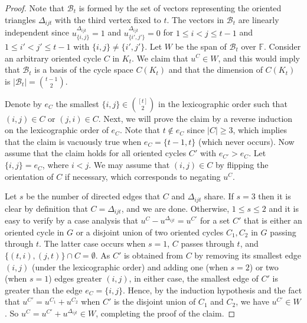 \documentclass[11pt]{article}
\newcommand\black[1]{{\color{black} #1}}
\begin{document}
\begin{proof}
\black{Note that $\mathcal{B}_t$ is formed by the set of vectors representing the oriented triangles $\Delta_{ijt}$ with the third vertex fixed to $t$.} The vectors in $\mathcal{B}_t$  are linearly independent since  $u^{\Delta_{ijt}}_{\{i,j\}}=1$ and $u^{\Delta_{ijt}}_{\{i',j'\}}=0$ for $1\leq i<j\leq t-1$ and  $1\leq i'<j'\leq t-1$ with $\{i,j\}\neq \{i',j'\}$.
Let $W$ be the span of $\mathcal{B}_t$ over $\mathbb{F}$.
Consider an arbitrary oriented cycle $C$ in $K_t$. We claim that $u^C\in W$, and this would imply that $\mathcal{B}_t$ is a basis of \black{the cycle space} $C(K_t)$ and that the dimension of $C(K_t)$ is $|\mathcal{B}_t|=\binom{t-1}{2}$.

Denote by $e_C$ the smallest $\{i,j\}\in \binom{[t]}{2}$ in the lexicographic order such that $(i,j)\in C$ or $(j,i)\in C$.
Next, we will prove the claim by a reverse induction on the lexicographic order of $e_C$. Note that $t\not\in e_C$ since $|C|\geq 3$, which implies that the claim is vacuously true when $e_C=\{t-1,t\}$ (which never occurs).
Now assume that the claim holds for all oriented cycles $C'$ with $e_{C'}> e_{C}$.
Let $\{i,j\}=e_C$, where $i<j$.
We may assume that $(i,j)\in C$ by flipping the orientation of $C$ if necessary, which corresponds to negating  $u^C$.


Let $s$ be the number of directed edges  that $C$ and $\Delta_{ijt}$ share. If $s=3$ then it is clear by definition that
$C=\Delta_{ijt}$, and we are done. Otherwise, $1\leq s\leq 2$ and it is easy to verify \black{by a case analysis} that $u^C-u^{\Delta_{ijt}}=u^{C'}$ for a set $C'$ that is either an oriented cycle in $G$ or a disjoint union of two oriented cycles $C_1, C_2$ in $G$ passing through $t$. The latter case occurs when \black{$s=1$, $C$ passes through $t$, and $\{(t,i),(j,t)\}\cap C=\emptyset$}. \black{As $C'$ is obtained from $C$ by removing its smallest edge $(i,j)$ (under the lexicographic order) and adding one (when $s=2$) or two (when $s=1$) edges greater $(i,j)$,} in either case, the smallest edge of $C'$  is greater than the edge $e_C=\{i,j\}$. Hence, by the induction hypothesis and the fact that $u^{C'}=u^{C_1}+u^{C_2}$ when $C'$ is the disjoint union of $C_1$ and $C_2$, we have $u^{C'}\in W$. So $u^C=u^{C'}+u^{\Delta_{ijt}}\in W$, completing the proof of the claim.
\end{proof}
\end{document}
